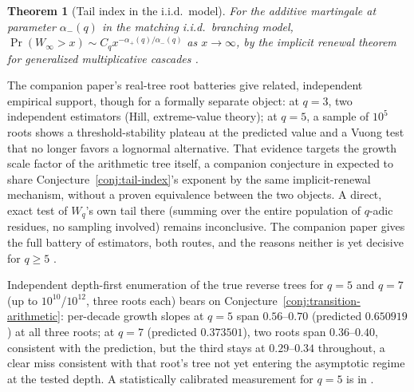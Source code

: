\documentclass[11pt]{article}
\newtheorem{theorem}{Theorem}[section]
\theoremstyle{definition}
\theoremstyle{remark}
\begin{document}
\begin{theorem}[Tail index in the i.i.d.\ model]\label{thm:iid-tail}
For the additive martingale at parameter $\alpha_-(q)$ in the matching
i.i.d.\ branching model, $\Pr(W_\infty>x)\sim C_qx^{-\alpha_+(q)/\alpha_-(q)}$
as $x\to\infty$, by the implicit renewal theorem for generalized
multiplicative cascades \cite{Liu2000}.
\end{theorem}

The companion paper's real-tree root batteries give related,
independent empirical support, though for a formally separate object:
at $q=3$, two independent estimators (Hill, extreme-value theory); at
$q=5$, a sample of $10^5$ roots shows a threshold-stability plateau at
the predicted value and a Vuong test that no longer favors a lognormal
alternative. That evidence targets the growth scale factor of the
arithmetic tree itself, a companion conjecture in
\cite{PressureCompanion} expected to share
Conjecture~\ref{conj:tail-index}'s exponent by the same implicit-renewal
mechanism, without a proven equivalence between the two objects. A
direct, exact test of $W_q$'s own tail there (summing over the entire
population of $q$-adic residues, no sampling involved) remains
inconclusive.
The companion paper gives the full battery of estimators, both routes,
and the reasons neither is yet decisive for $q\ge5$
\cite{PressureCompanion}.

Independent depth-first enumeration of the true reverse trees for
$q=5$ and $q=7$ (up to $10^{10}$/$10^{12}$, three roots each) bears on
Conjecture~\ref{conj:transition-arithmetic}: per-decade growth slopes
at $q=5$ span $0.56$--$0.70$ (predicted $0.650919$) at all three
roots; at $q=7$ (predicted $0.373501$), two roots span $0.36$--$0.40$,
consistent with the prediction, but the third stays at $0.29$--$0.34$
throughout, a clear miss consistent with that root's tree not yet
entering the asymptotic regime at the tested depth. A statistically
calibrated measurement for $q=5$ is in \cite{KLVolkovCompanion}.
\end{document}
